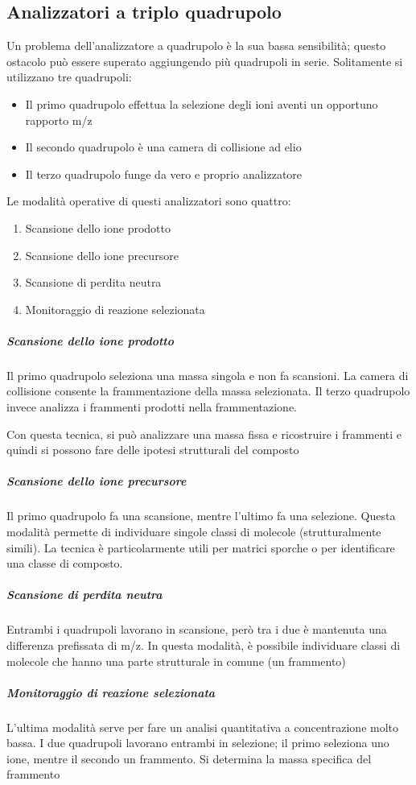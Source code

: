 \subsection{Analizzatori a triplo quadrupolo}
Un problema dell'analizzatore a quadrupolo è la sua bassa sensibilità; questo ostacolo può essere superato aggiungendo più quadrupoli in serie.
Solitamente si utilizzano tre quadrupoli:
\begin{itemize}
\item Il primo quadrupolo effettua la selezione degli ioni aventi un opportuno rapporto m/z
\item Il secondo quadrupolo è una camera di collisione ad elio
\item Il terzo quadrupolo funge da vero e proprio analizzatore
\end{itemize}

Le modalità operative di questi analizzatori sono quattro:
\begin{enumerate}
\item Scansione dello ione prodotto
\item Scansione dello ione precursore
\item Scansione di perdita neutra
\item Monitoraggio di reazione selezionata
\end{enumerate}

\subparagraph{Scansione dello ione prodotto}
Il primo quadrupolo seleziona una massa singola e non fa scansioni.
La camera di collisione consente la frammentazione della massa selezionata.
Il terzo quadrupolo invece analizza i frammenti prodotti nella frammentazione.

Con questa tecnica, si può analizzare una massa fissa e ricostruire i frammenti e quindi si possono fare delle ipotesi strutturali del composto

\subparagraph{Scansione dello ione precursore}
Il primo quadrupolo fa una scansione, mentre l'ultimo fa una selezione.
Questa modalità permette di individuare singole classi di molecole (strutturalmente simili).
La tecnica è particolarmente utili per matrici sporche o per identificare una classe di composto.

\subparagraph{Scansione di perdita neutra}
Entrambi i quadrupoli lavorano in scansione, però tra i due è mantenuta una differenza prefissata di m/z.
In questa modalità, è possibile individuare classi di molecole che hanno una parte strutturale in comune (un frammento)

\subparagraph{Monitoraggio di reazione selezionata}
L'ultima modalità serve per fare un analisi quantitativa a concentrazione molto bassa.
I due quadrupoli lavorano entrambi in selezione; il primo seleziona uno ione, mentre il secondo un frammento.
Si determina la massa specifica del frammento


